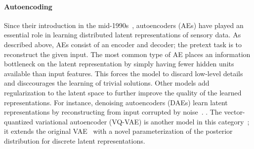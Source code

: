 
\paragraph{Autoencoding} 
Since their introduction in the mid-1990s~\cite{hinton_94}, autoencoders (AEs)
have played an essential role in learning distributed latent representations of
sensory data. 
As described above, AEs consist of an encoder and decoder; the pretext task
is to reconstruct the given input. The most common type of AE places an
information bottleneck on the latent representation by simply having fewer
hidden units available than input features. This forces the model to discard
low-level details and disccourages the learning of trivial solutions. Other models add
regularization to the latent space to further improve the quality of the
learned representations.
For instance, denoising autoencoders (DAEs) learn latent representations by
reconstructing from input corrupted by noise~\cite{DAE}. 
.
The vector-quantized variational autoencoder (VQ-VAE) is another model in this
category~\cite{vqvae};
it extends the original VAE~\cite{vae} with a novel
parameterization of the posterior distribution for discrete latent
representations. 



